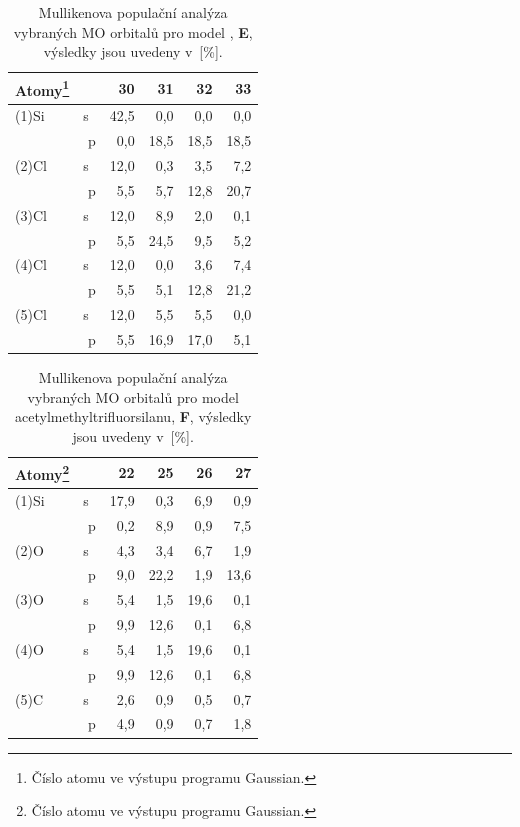 \documentclass[
digital, %
table,   %
nolof,     %
nolot,     %
oneside,
]{fithesis3}
\begin{document}
\begin{table}[H] \begin{minipage}{\textwidth}
\begin{center}
\caption{Mullikenova populační analýza vybraných MO orbitalů pro model , \textbf{E}, výsledky jsou uvedeny v~[\%].}
\begin{tabular}{|l|r|r|r|r|r|}
\hline
Atomy\footnote{Číslo atomu ve výstupu programu Gaussian.} \label{MP_si_cl4} &  & 30 & 31 & 32 & 33 \\ \hline
(1)Si & s~& 42,5  & 0,0  & 0,0  & 0,0  \\ \hline
& p & 0,0  & 18,5  & 18,5  & 18,5  \\ \hline
(2)Cl & s~& 12,0  & 0,3  & 3,5  & 7,2  \\ \hline
& p & 5,5  & 5,7  & 12,8  & 20,7  \\ \hline
(3)Cl & s~& 12,0  & 8,9  & 2,0  & 0,1  \\ \hline
& p & 5,5  & 24,5  & 9,5  & 5,2  \\ \hline
(4)Cl & s~& 12,0  & 0,0  & 3,6  & 7,4  \\ \hline
& p & 5,5  & 5,1  & 12,8  & 21,2  \\ \hline
(5)Cl & s~& 12,0  & 5,5  & 5,5  & 0,0  \\ \hline
& p & 5,5  & 16,9  & 17,0  & 5,1  \\ \hline
\end{tabular}\end{center}\end{minipage}\end{table}


\begin{table}[H] \begin{minipage}{\textwidth}
\caption{Mullikenova populační analýza vybraných MO orbitalů pro model acetylmethyltrifluorsilanu, \textbf{F}, výsledky jsou uvedeny v~[\%].}
\begin{center}
\begin{tabular}{|l|r|r|r|r|r|}
\hline
Atomy\footnote{Číslo atomu ve výstupu programu Gaussian.}\label{acetylmethyltrifluorsilan_MPA}&  & 22 & 25 & 26 & 27 \\ \hline
(1)Si & s~& 17,9  & 0,3  & 6,9  & 0,9  \\ \hline
& p & 0,2  & 8,9  & 0,9  & 7,5  \\ \hline
(2)O & s~& 4,3  & 3,4  & 6,7  & 1,9  \\ \hline
& p & 9,0  & 22,2  & 1,9  & 13,6  \\ \hline
(3)O & s~& 5,4  & 1,5  & 19,6  & 0,1  \\ \hline
& p & 9,9  & 12,6  & 0,1  & 6,8  \\ \hline
(4)O & s~& 5,4  & 1,5  & 19,6  & 0,1  \\ \hline
& p & 9,9  & 12,6  & 0,1  & 6,8  \\ \hline
(5)C & s~& 2,6  & 0,9  & 0,5  & 0,7  \\ \hline
& p & 4,9  & 0,9  & 0,7  & 1,8  \\ \hline
\end{tabular}\end{center}\end{minipage}\end{table}
\end{document}
